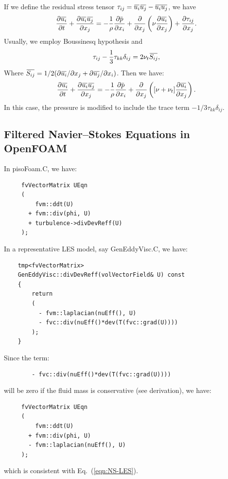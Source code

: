 \documentclass[11pt]{article}
\newcommand{\overbar}[1]{\mkern 1.5mu\overline{\mkern-1.5mu#1\mkern-1.5mu}\mkern 1.5mu}
\begin{document}
  If we define the residual stress tensor $\tau_{ij} = \overbar{u_i}\overbar{u_j} - \overbar{u_i
  u_j}$, we have
  \begin{equation}
    \frac{\partial \overbar{u_i}}{\partial t}
    +\frac{\partial \overbar{u_i} \overbar{u_j}}{\partial x_j} = 
    - \frac{1}{\rho}\frac{\partial \overbar{p}}{\partial x_i}
    + \frac{\partial}{\partial x_j}\left( \nu\frac{\partial \overbar{u_i}}{\partial x_j}\right)
    + \frac{\partial \tau_{ij}}{\partial x_j}.
  \label{eqn:NS-decom}
  \end{equation}
  Usually, we employ Boussinesq hypothesis and 
  \begin{equation}
    \tau_{ij}-\frac{1}{3}\tau_{kk}\delta_{ij} = 2 \nu_t \overbar{S_{ij}},
  \label{eqn:NS-tauij}
  \end{equation}
  Where $\overbar{S_{ij}} = 1/2 (\partial \overbar{u_i}/\partial x_j + \partial
  \overbar{u_j}/\partial x_i)$. Then we have:
  \begin{equation}
    \frac{\partial \overbar{u_i}}{\partial t}
    + \frac{\partial \overbar{u_i}\overbar{u_j}}{\partial x_j} = 
    - \frac{1}{\rho}\frac{\partial \overbar{p}}{\partial x_i}
    + \frac{\partial}{\partial x_j}\left([\nu+\nu_t]\frac{\partial \overbar{u_i}}{\partial x_j}\right).
  \label{eqn:NS-LES}
  \end{equation}
  In this case, the pressure is modified to include the trace term $-1/3\tau_{kk}\delta_{ij}$.

\subsection{Filtered Navier--Stokes Equations in OpenFOAM}

In pisoFoam.C, we have:
    \begin{lstlisting}
     fvVectorMatrix UEqn
     (
         fvm::ddt(U)
       + fvm::div(phi, U)
       + turbulence->divDevReff(U)
     );
    \end{lstlisting}
In a representative LES model, say GenEddyVisc.C, we have:
    \begin{lstlisting}
    tmp<fvVectorMatrix> 
    GenEddyVisc::divDevReff(volVectorField& U) const
    {
        return
        (
          - fvm::laplacian(nuEff(), U)
          - fvc::div(nuEff()*dev(T(fvc::grad(U))))
        );
    }
    \end{lstlisting}

Since the term:
    \begin{lstlisting}
        - fvc::div(nuEff()*dev(T(fvc::grad(U))))
    \end{lstlisting}
will be zero if the fluid mass is conservative (see derivation), we have:
    \begin{lstlisting}
     fvVectorMatrix UEqn
     (
         fvm::ddt(U)
       + fvm::div(phi, U)
       - fvm::laplacian(nuEff(), U)
     );
    \end{lstlisting}
which is consistent with Eq.~(\ref{eqn:NS-LES}).
\end{document}
